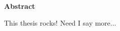 \pagestyle{plain}
\setcounter{page}{2}

\begin{center}
    {\LARGE\bf Abstract}
\end{center}

This thesis rocks! Need I say more...

\newpage

